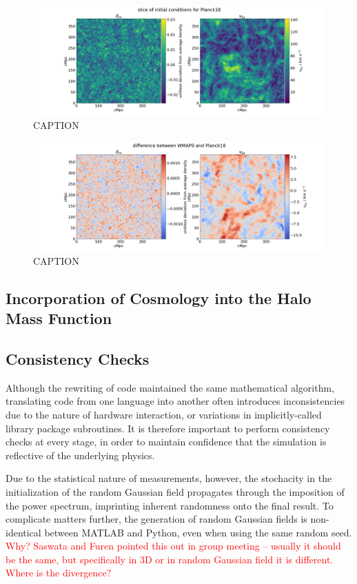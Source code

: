 \documentclass[floats,floatfix,showpacs,amssymb,prd,superscriptaddress,nofootinbib]{revtex4-2} %
\newcommand{\red}{\textcolor{red}}
\begin{document}
\begin{figure}[H]
    \centering
    \includegraphics[width=0.9\columnwidth]{images/ic_grids/initial_condition_grid_Planck18.png}
    \caption{CAPTION}
    \label{fig:initial_condition_grid_Planck18}
\end{figure}

\begin{figure}[H]
    \centering
    \includegraphics[width=0.9\columnwidth]{images/ic_grids/difference_in_initial_grid_WMAP9_Planck18.png}
    \caption{CAPTION}
    \label{fig:difference_in_initial_grid_WMAP9_Planck18}
\end{figure}

\newpage
\subsection{Incorporation of Cosmology into the Halo Mass Function}
\subsection{Consistency Checks}
Although the rewriting of code maintained the same mathematical algorithm, translating code from one language into another often introduces inconsistencies due to the nature of hardware interaction, or variations in implicitly-called library package subroutines. It is therefore important to perform consistency checks at every stage, in order to maintain confidence that the simulation is reflective of the underlying physics.

Due to the statistical nature of measurements, however, the stochacity in the initialization of the random Gaussian field propagates through the imposition of the power spectrum, imprinting inherent randomness onto the final result. To complicate matters further, the generation of random Gaussian fields is non-identical between MATLAB and Python, even when using the same random seed. \red{Why? Saswata and Furen pointed this out in group meeting -- usually it should be the same, but specifically in 3D or in random Gaussian field it is different. Where is the divergence?} 
\end{document}
